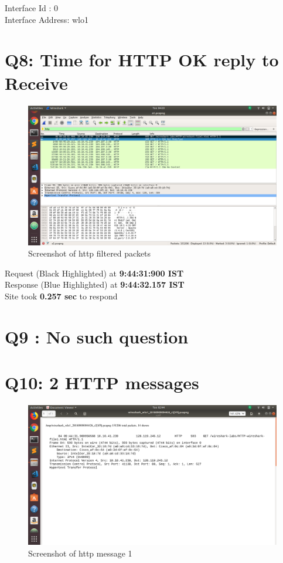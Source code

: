 \documentclass{article}
\begin{document}
 Interface Id     : 0\\
 Interface Address: wlo1\\
 
 
\section{Q8: Time for HTTP OK reply to Receive}
 \begin{figure}[H]
 \centering
 \includegraphics[width=1.0\textwidth]{../q8/a.png}
 \caption{\label{fig:PING}Screenshot of http filtered packets}
 \end{figure}
  
  
 Request (Black Highlighted) at \textbf{9:44:31:900 IST}\\
 Response (Blue Highlighted) at \textbf{9:44:32.157 IST}\\
 
 Site took \textbf{0.257 sec} to respond\\
 
\section{Q9 : No such question}

\section{Q10: 2 HTTP messages}
 \begin{figure}[H]
 \centering
 \includegraphics[width=1.0\textwidth]{../q10/a.png}
 \caption{\label{fig:PING}Screenshot of http message 1}
 \end{figure}
 
\end{document}
